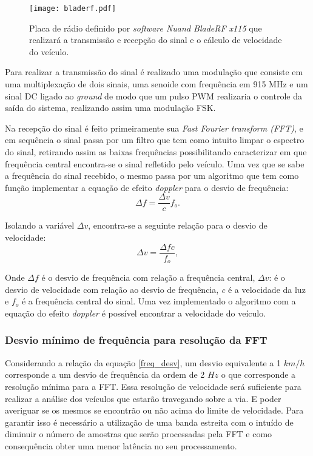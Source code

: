\begin{figure}[H]
    \centering
   \texttt{[image: bladerf.pdf]}
   \caption{Placa de rádio definido por \emph{software Nuand BladeRF x115} que realizará a transmissão e recepção do sinal e o cálculo de velocidade do veículo.}
   \label{bladerf}
    \end{figure}

Para realizar a transmissão do sinal é realizado uma modulação que consiste em uma multiplexação de dois sinais, uma senoide com frequência em 915 MHz e um sinal DC ligado ao \emph{ground} de modo que um pulso PWM realizaria o controle da saída do sistema, realizando assim uma modulação FSK.

Na recepção do sinal é feito primeiramente sua \emph{Fast Fourier transform (FFT)}, e em sequência o sinal passa por um filtro que tem como intuito limpar o espectro do sinal, retirando assim as baixas frequências possibilitando caracterizar em que frequência central encontra-se o sinal refletido pelo veículo. Uma vez que se sabe a frequência do sinal recebido, o mesmo passa por um algoritmo que tem como função implementar a equação de efeito \emph{doppler} para o desvio de frequência:
\begin{equation}\label{freq_desv}
  \Delta f = \frac{\Delta v}{c}f_o.
\end{equation}

Isolando a variável $\Delta v$, encontra-se a seguinte relação para o desvio de velocidade:
\begin{equation}\label{vel}
  \Delta v = \frac{\Delta f c}{f_o},
\end{equation}

Onde $\Delta f$ é o desvio de frequência com relação a frequência central, $\Delta v$: é o desvio de velocidade com relação ao desvio de frequência, \emph{c} é a velocidade da luz e $f_o$ é a frequência central do sinal. Uma vez implementado o algoritmo com a equação do efeito \emph{doppler} é possível encontrar a velocidade do veículo.

\subsubsection{Desvio mínimo de frequência para resolução da FFT}

 Considerando a relação da equação \ref{freq_desv}, um desvio equivalente a 1 $km/h$ corresponde a um desvio de frequência da ordem de 2 $Hz$ o que corresponde a resolução mínima para a FFT. Essa resolução de velocidade será suficiente para realizar a análise dos veículos que estarão travegando sobre a via. E poder averiguar se os mesmos se encontrão ou não acima do limite de velocidade. Para garantir isso é necessário a utilização de uma banda estreita com o intuído de diminuir o número de amostras que serão processadas pela FFT e como consequência obter uma menor latência no seu processamento.
 
